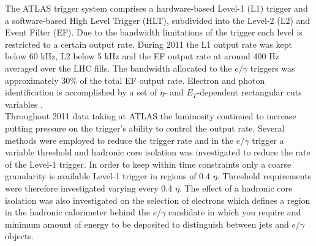 	The ATLAS trigger system comprises a
	hardware-based Level-1 (L1) trigger and a software-based
	High Level Trigger (HLT), subdivided into the Level-2
	(L2) and Event Filter (EF). Due to the bandwidth
	limitations of the trigger each level is restricted to a
	certain output rate. During 2011 the L1 output rate was
	kept below 60 kHz, L2 below 5 kHz and the EF output
	rate at around 400 Hz averaged over the LHC fills. The
	bandwidth allocated to the $e/\gamma$ triggers was
	approximately 30\% of the total EF output rate.
	Electron and photon identification is accomplished by a
	set of $\eta$- and $E_{T}$-dependent rectangular cuts variables
	\cite{trig1, trig2}.\\
	Throughout 2011 data taking at ATLAS the luminosity continued to increase putting pressure on the trigger's ability to control the output rate. Several methods were employed to reduce the trigger rate and in the $e/\gamma$ trigger a variable threshold and hadronic core isolation was investigated to reduce the rate of the Level-1 trigger. In order to keep within time constraints only a coarse granularity is available Level-1 trigger in regions of 0.4 $\eta$. Threshold requirements were therefore investigated varying every 0.4 $\eta$. The effect of a hadronic core isolation was also investigated on the selection of electrons which defines a region in the hadronic calorimeter behind the $e/\gamma$ candidate in which you require and minimum amount of energy to be deposited to distinguish between jets and $e/\gamma$ objects. 


